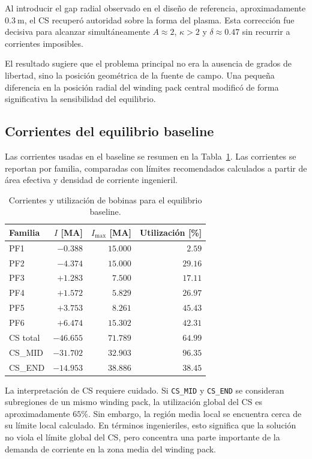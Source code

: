 \documentclass[11pt,a4paper]{article}
\begin{document}
Al introducir el gap radial observado en el diseño de referencia, aproximadamente
$0.3~\mathrm{m}$, el CS recuperó autoridad sobre la forma del plasma. Esta corrección fue decisiva
para alcanzar simultáneamente $A\approx2$, $\kappa>2$ y $\delta\approx0.47$ sin recurrir a
corrientes imposibles.

El resultado sugiere que el problema principal no era la ausencia de grados de libertad, sino
la posición geométrica de la fuente de campo. Una pequeña diferencia en la posición radial del
winding pack central modificó de forma significativa la sensibilidad del equilibrio.

\subsection{Corrientes del equilibrio baseline}
Las corrientes usadas en el baseline se resumen en la Tabla~\ref{tab:baseline_currents}. Las
corrientes se reportan por familia, comparadas con límites recomendados calculados a partir
de área efectiva y densidad de corriente ingenieril.

\begin{table}[htbp]
\centering
\caption{Corrientes y utilización de bobinas para el equilibrio baseline.}
\label{tab:baseline_currents}
\begin{tabular}{lrrr}
\toprule
\textbf{Familia} & \textbf{$I$ [MA]} & \textbf{$I_{\max}$ [MA]} & \textbf{Utilización [\%]} \\
\midrule
PF1 & $-0.388$ & $15.000$ & $2.59$ \\
PF2 & $-4.374$ & $15.000$ & $29.16$ \\
PF3 & $+1.283$ & $7.500$ & $17.11$ \\
PF4 & $+1.572$ & $5.829$ & $26.97$ \\
PF5 & $+3.753$ & $8.261$ & $45.43$ \\
PF6 & $+6.474$ & $15.302$ & $42.31$ \\
CS total & $-46.655$ & $71.789$ & $64.99$ \\
CS\_MID & $-31.702$ & $32.903$ & $96.35$ \\
CS\_END & $-14.953$ & $38.886$ & $38.45$ \\
\bottomrule
\end{tabular}
\end{table}

La interpretación de CS requiere cuidado. Si \texttt{CS\_MID} y \texttt{CS\_END} se consideran
subregiones de un mismo winding pack, la utilización global del CS es aproximadamente $65\%$.
Sin embargo, la región media local se encuentra cerca de su límite local calculado. En términos
ingenieriles, esto significa que la solución no viola el límite global del CS, pero concentra una
parte importante de la demanda de corriente en la zona media del winding pack.
\end{document}
